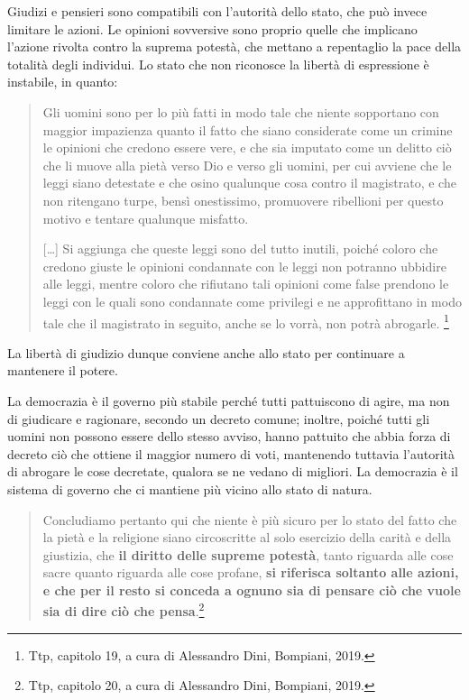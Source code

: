 Giudizi e pensieri sono compatibili con l'autorità dello stato, che può invece limitare le azioni. Le opinioni sovversive sono proprio quelle che implicano l'azione rivolta contro la suprema potestà, che mettano a repentaglio la pace della totalità degli individui. Lo stato che non riconosce la libertà di espressione è instabile, in quanto:

\begin{quotation}
	\small Gli uomini sono per lo più fatti in modo tale che niente sopportano con maggior impazienza quanto il fatto che siano considerate come un crimine le opinioni che credono essere vere, e che sia imputato come un delitto ciò che li muove alla pietà verso Dio e verso gli uomini, per cui avviene che le leggi siano detestate e che osino qualunque cosa contro il magistrato, e che non ritengano turpe, bensì onestissimo, promuovere ribellioni per questo motivo e tentare qualunque misfatto.
	
	[\dots] Si aggiunga che queste leggi sono del tutto inutili, poiché coloro che credono giuste le opinioni condannate con le leggi non potranno ubbidire alle leggi, mentre coloro che rifiutano tali opinioni come false prendono le leggi con le quali sono condannate come privilegi e ne approfittano in modo tale che il magistrato in seguito, anche se lo vorrà, non potrà abrogarle.
	\footnote{Ttp, capitolo 19, a cura di Alessandro Dini, Bompiani, 2019.}
\end{quotation}

La libertà di giudizio dunque conviene anche allo stato per continuare a mantenere il potere.

La democrazia è il governo più stabile perché tutti pattuiscono di agire, ma non di giudicare e ragionare, secondo un decreto comune; inoltre,  poiché tutti gli uomini non possono essere dello stesso avviso, hanno pattuito che abbia forza di decreto ciò che  ottiene il maggior numero di voti, mantenendo tuttavia l'autorità di abrogare le cose decretate, qualora se ne vedano di migliori. La democrazia è il sistema di governo che ci mantiene più vicino allo stato di natura.

\begin{quotation}
	\small Concludiamo pertanto qui che niente è più sicuro per lo stato del fatto che la pietà e la religione siano circoscritte al solo esercizio della carità  e della giustizia, che \textbf{il diritto delle supreme potestà}, tanto riguarda alle cose sacre quanto riguarda alle cose profane, \textbf{si riferisca soltanto alle azioni, e che per il resto si conceda a ognuno sia di pensare ciò che vuole sia di dire ciò che pensa}.\footnote{Ttp, capitolo 20, a cura di Alessandro Dini, Bompiani, 2019.}
\end{quotation}

\newpage
